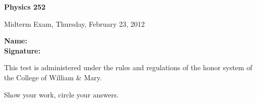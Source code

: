 \documentclass[letterpaper,addpoints,answers]{exam}
\begin{document}

\begin{coverpages}
	\noindent 
  \large\bfseries Physics 252

  \vspace{2ex}
	\noindent 
  Midterm Exam, Thursday,  February  23, 2012

  \vspace{5ex}
	\noindent 
  \large\bfseries Name:\enspace\makebox[2in]{\hrulefill}\\

  \vspace{5ex}
	\noindent 
  \large\bfseries Signature:\enspace\makebox[2in]{\hrulefill}

  \vspace{5ex}
	\noindent 
	This test is administered under the rules and regulations of the honor 
	system of the College of William \& Mary.  

  \vspace{5ex}
	\noindent 
	Show your work, circle your answers.


  \vspace{5ex}
  \gradetable[v][questions]
\end{coverpages}
 
\end{document}
